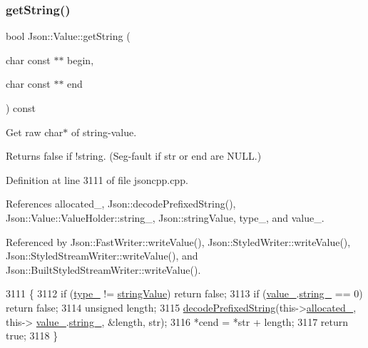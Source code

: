 \subsubsection{\texorpdfstring{get\+String()}{getString()}}
{\footnotesize\ttfamily bool Json\+::\+Value\+::get\+String (\begin{DoxyParamCaption}\item[{char const $\ast$$\ast$}]{begin,  }\item[{char const $\ast$$\ast$}]{end }\end{DoxyParamCaption}) const}

Get raw char$\ast$ of string-\/value. \begin{DoxyReturn}{Returns}
false if !string. (Seg-\/fault if str or end are N\+U\+LL.) 
\end{DoxyReturn}


Definition at line 3111 of file jsoncpp.\+cpp.



References allocated\+\_\+, Json\+::decode\+Prefixed\+String(), Json\+::\+Value\+::\+Value\+Holder\+::string\+\_\+, Json\+::string\+Value, type\+\_\+, and value\+\_\+.



Referenced by Json\+::\+Fast\+Writer\+::write\+Value(), Json\+::\+Styled\+Writer\+::write\+Value(), Json\+::\+Styled\+Stream\+Writer\+::write\+Value(), and Json\+::\+Built\+Styled\+Stream\+Writer\+::write\+Value().


\begin{DoxyCode}
3111                                                                \{
3112   \textcolor{keywordflow}{if} (\hyperlink{class_json_1_1_value_abd222c2536dc88bf330dedcd076d2356}{type\_} != \hyperlink{namespace_json_a7d654b75c16a57007925868e38212b4ea804ef857affea2d415843c73f261c258}{stringValue}) \textcolor{keywordflow}{return} \textcolor{keyword}{false};
3113   \textcolor{keywordflow}{if} (\hyperlink{class_json_1_1_value_aef578244546212705b9f81eb84d7e151}{value\_}.\hyperlink{union_json_1_1_value_1_1_value_holder_a70ac2b153bc405527baa3850d2ddc3cb}{string\_} == 0) \textcolor{keywordflow}{return} \textcolor{keyword}{false};
3114   \textcolor{keywordtype}{unsigned} length;
3115   \hyperlink{namespace_json_aad8b4982c1acd164f541fba396ac9fb1}{decodePrefixedString}(this->\hyperlink{class_json_1_1_value_ae0126c80dc4907aad94088553fc7632b}{allocated\_}, this->
      \hyperlink{class_json_1_1_value_aef578244546212705b9f81eb84d7e151}{value\_}.\hyperlink{union_json_1_1_value_1_1_value_holder_a70ac2b153bc405527baa3850d2ddc3cb}{string\_}, &length, str);
3116   *cend = *str + length;
3117   \textcolor{keywordflow}{return} \textcolor{keyword}{true};
3118 \}
\end{DoxyCode}
\mbox{\label{class_json_1_1_value_a65d8e3ab6a5871cbd019a3e0f0b944a3}} 
